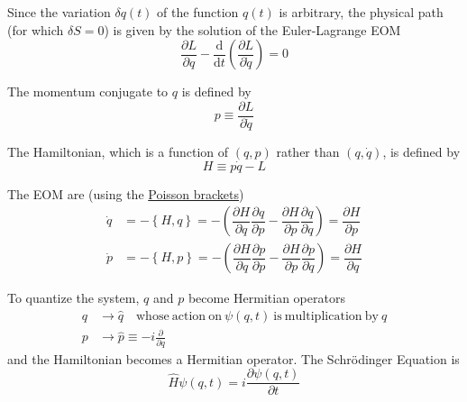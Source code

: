 \documentclass{article}
\begin{document}
\noindent Since the variation $ \delta q (t) $ of the function $q(t)$ is arbitrary, the physical path (for which $\delta S = 0$) is given by the solution of the Euler-Lagrange EOM
\begin{equation*}
    \dfrac{ \partial L }{ \partial q } - \dfrac{\mathrm{d}}{ \mathrm{d} t } \left( \dfrac{ \partial L }{ \partial \dot{q} } \right) = 0
\end{equation*}

\noindent The momentum conjugate to $q$ is defined by
\begin{equation*}
    p \equiv \dfrac{ \partial L }{ \partial \dot{q} }
\end{equation*}

\noindent The Hamiltonian, which is a function of $(q, p)$ rather than $(q, \dot{q})$, is defined by
\begin{equation*}
    H \equiv p \dot{q} - L
\end{equation*}

\noindent The EOM are (using the \underline{Poisson brackets})
\begin{align*}
    \dot{q} &= - \left\lbrace H, q \right\rbrace = - \left( \dfrac{ \partial H }{ \partial q } \dfrac{ \partial q }{ \partial p } - \dfrac{ \partial H }{ \partial p } \dfrac{ \partial q }{ \partial q } \right) = \dfrac{ \partial H }{ \partial p } \\
    \dot{p} &= - \left\lbrace H, p \right\rbrace = - \left( \dfrac{ \partial H }{ \partial q } \dfrac{ \partial p }{ \partial p } - \dfrac{ \partial H }{ \partial p } \dfrac{ \partial p }{ \partial q } \right) = \dfrac{ \partial H }{ \partial q }
\end{align*}

\noindent To quantize the system, $q$ and $p$ become Hermitian operators
\begin{align*}
    q &\longrightarrow \hat{q} \quad \mathrm{whose} ~ \mathrm{action} ~ \mathrm{on} ~ \psi (q, t) ~ \mathrm{is} ~ \mathrm{multiplication} ~ \mathrm{by} ~ q \\
    p &\longrightarrow \hat{p} \equiv -i \frac{\partial}{ \partial q }
\end{align*}
and the Hamiltonian becomes a Hermitian operator. The Schr\"{o}dinger Equation is
\begin{equation*}
    \hat{H} \psi (q, t) = i \dfrac{ \partial \psi (q, t) }{ \partial t }
\end{equation*}
\end{document}
